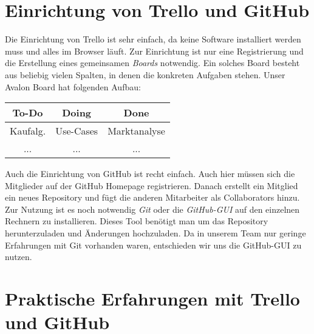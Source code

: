 \section{Einrichtung von Trello und GitHub}
 Die Einrichtung von Trello ist sehr einfach, da keine Software installiert werden muss und alles im Browser läuft. Zur Einrichtung ist nur eine Registrierung und die Erstellung eines gemeinsamen \textit{Boards} notwendig. Ein solches Board besteht aus beliebig vielen Spalten, in denen die konkreten Aufgaben stehen. Unser Avalon Board hat folgenden Aufbau:\\
\begin{center}
\begin{tabular}{|c|c|c|}\hline
  \textbf{ To-Do} & \textbf{Doing} & \textbf{Done} \\ \hline
   Kaufalg. & Use-Cases & Marktanalyse \\ \hline
   ... & ... & ... \\ \hline
 \end{tabular}
\end{center}
Auch die Einrichtung von GitHub ist recht einfach. Auch hier müssen sich die Mitglieder auf der GitHub Homepage registrieren. Danach erstellt ein Mitglied ein neues Repository und fügt die anderen Mitarbeiter als Collaborators hinzu. Zur Nutzung ist es noch notwendig \textit{Git} oder die \textit{GitHub-GUI} auf den einzelnen Rechnern zu installieren. Dieses Tool benötigt man um das Repository herunterzuladen und Änderungen hochzuladen. Da in unserem Team nur geringe Erfahrungen mit Git vorhanden waren, entschieden wir uns die GitHub-GUI zu nutzen.
\section{Praktische Erfahrungen mit Trello und GitHub}

